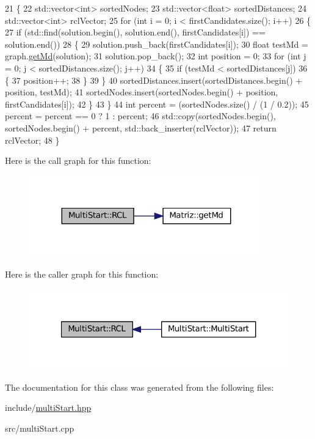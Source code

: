 \begin{DoxyCode}
21 \{
22   std::vector<int> sortedNodes;
23   std::vector<float> sortedDistances;
24   std::vector<int> rclVector;
25   \textcolor{keywordflow}{for} (\textcolor{keywordtype}{int} i = 0; i < firstCandidates.size(); i++)
26   \{
27     \textcolor{keywordflow}{if} (std::find(solution.begin(), solution.end(), firstCandidates[i]) == solution.end())
28     \{
29       solution.push\_back(firstCandidates[i]);
30       \textcolor{keywordtype}{float} testMd = graph.\hyperlink{classMatriz_a8df14a27d791f24206dd633b2a685c5b}{getMd}(solution);
31       solution.pop\_back();
32       \textcolor{keywordtype}{int} position = 0;
33       \textcolor{keywordflow}{for} (\textcolor{keywordtype}{int} j = 0; j < sortedDistances.size(); j++)
34       \{
35         \textcolor{keywordflow}{if} (testMd < sortedDistances[j])
36         \{
37           position++;
38         \}
39       \}
40       sortedDistances.insert(sortedDistances.begin() + position, testMd);
41       sortedNodes.insert(sortedNodes.begin() + position, firstCandidates[i]);
42     \}
43   \}
44   \textcolor{keywordtype}{int} percent = (sortedNodes.size() / (1 / 0.2));
45   percent = percent == 0 ? 1 : percent;
46   std::copy(sortedNodes.begin(), sortedNodes.begin() + percent, std::back\_inserter(rclVector));
47   \textcolor{keywordflow}{return} rclVector;
48 \}
\end{DoxyCode}
Here is the call graph for this function\+:\nopagebreak
\begin{figure}[H]
\begin{center}
\leavevmode
\includegraphics[width=287pt]{classMultiStart_a456dc441b6e7028aa86a0488830f9bc1_cgraph}
\end{center}
\end{figure}
Here is the caller graph for this function\+:\nopagebreak
\begin{figure}[H]
\begin{center}
\leavevmode
\includegraphics[width=321pt]{classMultiStart_a456dc441b6e7028aa86a0488830f9bc1_icgraph}
\end{center}
\end{figure}


The documentation for this class was generated from the following files\+:\begin{DoxyCompactItemize}
\item 
include/\hyperlink{multiStart_8hpp}{multi\+Start.\+hpp}\item 
src/multi\+Start.\+cpp\end{DoxyCompactItemize}
